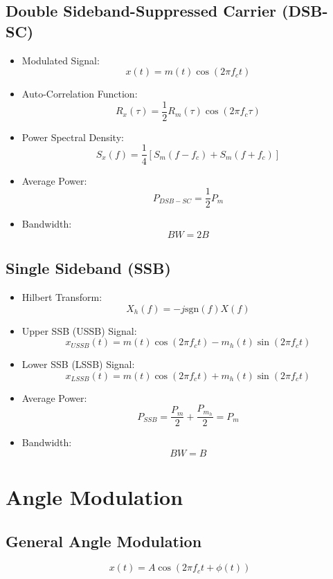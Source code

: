 \documentclass[12pt]{AnantDocumentatioe}
\begin{document}
\subsection{Double Sideband-Suppressed Carrier (DSB-SC)}

\begin{itemize}
    \item Modulated Signal:
    \[
        x(t) = m(t) \cos(2\pi f_c t)
    \]
    \item Auto-Correlation Function:
    \[
        R_x(\tau) = \frac{1}{2} R_m(\tau) \cos(2\pi f_c \tau)
    \]
    \item Power Spectral Density:
    \[
        S_x(f) = \frac{1}{4}[S_m(f-f_c) + S_m(f+f_c)]
    \]
    \item Average Power:
    \[
        P_{DSB-SC} = \frac{1}{2} P_m
    \]
    \item Bandwidth:
    \[
        BW = 2B
    \]
\end{itemize}

\subsection{Single Sideband (SSB)}

\begin{itemize}
    \item Hilbert Transform:
    \[
        X_h(f) = -j \text{sgn}(f) X(f)
    \]
    \item Upper SSB (USSB) Signal:
    \[
        x_{USSB}(t) = m(t) \cos(2\pi f_c t) - m_h(t) \sin(2\pi f_c t)
    \]
    \item Lower SSB (LSSB) Signal:
    \[
        x_{LSSB}(t) = m(t) \cos(2\pi f_c t) + m_h(t) \sin(2\pi f_c t)
    \]
    \item Average Power:
    \[
        P_{SSB} = \frac{P_m}{2} + \frac{P_{m_h}}{2} = P_m
    \]
    \item Bandwidth:
    \[
        BW = B
    \]
\end{itemize}

\section{Angle Modulation}

\subsection{General Angle Modulation}

\[
x(t) = A \cos(2\pi f_c t + \phi(t))
\]
\end{document}
